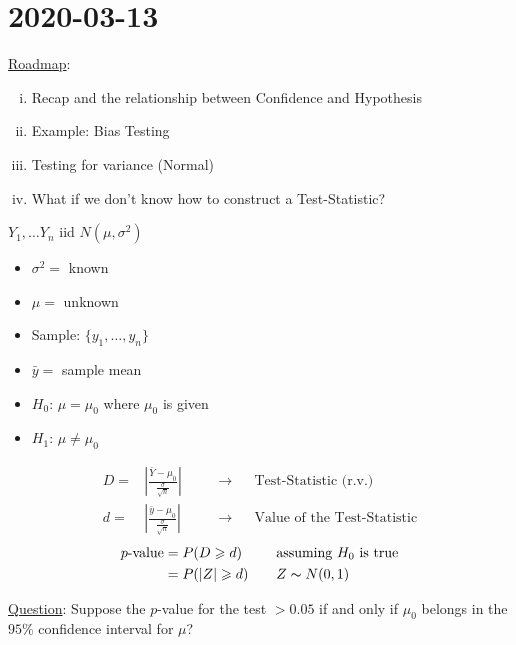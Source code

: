 \section{2020-03-13}
\underline{Roadmap}:
\begin{enumerate}[(i)]
    \item Recap and the relationship between Confidence and Hypothesis
    \item Example: Bias Testing
    \item Testing for variance (Normal)
    \item What if we don't know how to construct a Test-Statistic?
\end{enumerate}

\begin{exbox}
    \begin{example}
        $ Y_1,\ldots Y_n $ iid $ N(\mu,\sigma^2) $
        \begin{itemize}
            \item $ \sigma^2= $ known
            \item $ \mu= $ unknown
            \item Sample: $ \{y_1,\ldots ,y_n\} $
            \item $ \bar{y}= $ sample mean
            \item $ H_0 $: $ \mu=\mu_0 $ where $ \mu_0 $ is given
            \item $ H_1 $: $ \mu \neq \mu_0 $
        \end{itemize}
        \[
            \begin{aligned}
                D= & \left|\frac{\bar{Y}-\mu_0}{\frac{\sigma}{\sqrt{n}}} \right|
                   & \quad                                                       & \rightarrow &  & \text{Test-Statistic (r.v.)}       \\
                d= & \left|\frac{\bar{y}-\mu_0}{\frac{\sigma}{\sqrt{n}}} \right|
                   &                                                             & \rightarrow &  & \text{Value of the Test-Statistic}
            \end{aligned}
        \]
        \[
            \begin{aligned}
                p\text{-value}
                 & =P(D\geqslant d)   & \quad & \text{assuming }H_0\text{ is true} \\
                 & =P(|Z|\geqslant d) &       & Z \thicksim N(0,1)
            \end{aligned}
        \]
    \end{example}
\end{exbox}
\underline{Question}: Suppose the $ p $-value for the test $ >0.05 $
if and only if $ \mu_0 $ belongs in the $ 95\% $ confidence interval for $ \mu $?

